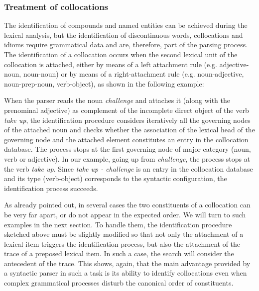 \documentclass[output=paper]{langsci/langscibook}
\begin{document}
\subsubsection{Treatment of collocations}

The identification of compounds and named entities can be achieved during the lexical analysis, but the identification of discontinuous words, collocations and idioms require grammatical data and are, therefore, part of the parsing process. The identification of a collocation occurs when the second lexical unit of the collocation is attached, either by means of a left attachment rule (e.g. adjective-noun, noun-noun) or by means of a right-attachment rule (e.g. noun-adjective, noun-prep-noun, verb-object), as shown in the following example:

\vspace*{3mm}

When the parser reads the noun \textit{challenge} and attaches it (along with the prenominal adjective) as complement of the incomplete   direct object of the verb \textit{take up}, the identification procedure considers iteratively all the governing nodes of the attached noun and checks whether the association of the lexical head of the governing node and the attached element constitutes an entry in the collocation database. The process stops at the first governing node of major category (noun, verb or adjective). In our example, going up from \textit{challenge}, the process stops at the verb \textit{take up}. Since \textit{take up - challenge} is an entry in the collocation database and its type (verb-object) corresponds to the syntactic configuration, the identification process succeeds.

As already pointed out, in several cases the two constituents of a collocation can be very far apart, or do not appear in the expected order. We will turn to such examples in the next section. To handle them, the identification procedure sketched above must be slightly modified so that not only the attachment of a lexical item triggers the identification process, but also the attachment of the trace of a preposed lexical item. In such a case, the search will consider the antecedent of the trace. 
This shows, again, that the main advantage provided by a syntactic parser in such a task is its ability to identify collocations even when complex grammatical processes disturb the canonical order of constituents.
\end{document}
